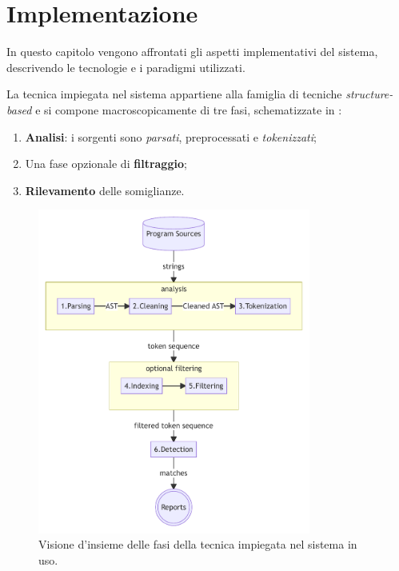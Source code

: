 \chapter{Implementazione}
\label{chapter:implementation}
In questo capitolo vengono affrontati gli aspetti implementativi del sistema, descrivendo le tecnologie e i paradigmi utilizzati.

\vspace*{0.5cm}

La tecnica impiegata nel sistema appartiene alla famiglia di tecniche \textit{structure-based} e si compone macroscopicamente di tre fasi, schematizzate in :
\begin{enumerate}
	\item \textbf{Analisi}: i sorgenti sono \textit{parsati}, preprocessati e \textit{tokenizzati};
	\item Una fase opzionale di \textbf{filtraggio};
	\item \textbf{Rilevamento} delle somiglianze.
\end{enumerate}

\begin{figure}[h!]
    \centering
    \includegraphics[width=0.8\textwidth]{resources/img/03-system-overview.pdf}
    \caption{Visione d'insieme delle fasi della tecnica impiegata nel sistema in uso.}
    \label{img:03-system-overview}
\end{figure}

